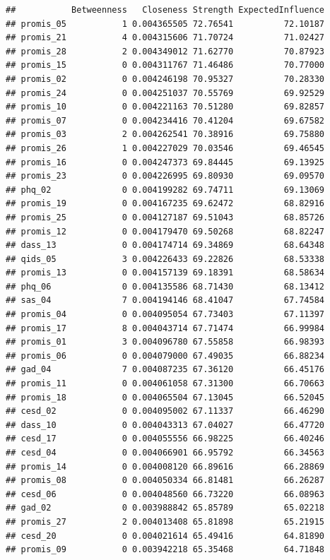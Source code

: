 \documentclass[
]{article}
\begin{document}
\begin{verbatim}
##           Betweenness   Closeness Strength ExpectedInfluence
## promis_05           1 0.004365505 72.76541          72.10187
## promis_21           4 0.004315606 71.70724          71.02427
## promis_28           2 0.004349012 71.62770          70.87923
## promis_15           0 0.004311767 71.46486          70.77000
## promis_02           0 0.004246198 70.95327          70.28330
## promis_24           0 0.004251037 70.55769          69.92529
## promis_10           0 0.004221163 70.51280          69.82857
## promis_07           0 0.004234416 70.41204          69.67582
## promis_03           2 0.004262541 70.38916          69.75880
## promis_26           1 0.004227029 70.03546          69.46545
## promis_16           0 0.004247373 69.84445          69.13925
## promis_23           0 0.004226995 69.80930          69.09570
## phq_02              0 0.004199282 69.74711          69.13069
## promis_19           0 0.004167235 69.62472          68.82916
## promis_25           0 0.004127187 69.51043          68.85726
## promis_12           0 0.004179470 69.50268          68.82247
## dass_13             0 0.004174714 69.34869          68.64348
## qids_05             3 0.004226433 69.22826          68.53338
## promis_13           0 0.004157139 69.18391          68.58634
## phq_06              0 0.004135586 68.71430          68.13412
## sas_04              7 0.004194146 68.41047          67.74584
## promis_04           0 0.004095054 67.73403          67.11397
## promis_17           8 0.004043714 67.71474          66.99984
## promis_01           3 0.004096780 67.55858          66.98393
## promis_06           0 0.004079000 67.49035          66.88234
## gad_04              7 0.004087235 67.36120          66.45176
## promis_11           0 0.004061058 67.31300          66.70663
## promis_18           0 0.004065504 67.13045          66.52045
## cesd_02             0 0.004095002 67.11337          66.46290
## dass_10             0 0.004043313 67.04027          66.47720
## cesd_17             0 0.004055556 66.98225          66.40246
## cesd_04             0 0.004066901 66.95792          66.34563
## promis_14           0 0.004008120 66.89616          66.28869
## promis_08           0 0.004050334 66.81481          66.26287
## cesd_06             0 0.004048560 66.73220          66.08963
## gad_02              0 0.003988842 65.85789          65.02218
## promis_27           2 0.004013408 65.81898          65.21915
## cesd_20             0 0.004021614 65.49416          64.81890
## promis_09           0 0.003942218 65.35468          64.71848

\end{verbatim}
\end{document}
